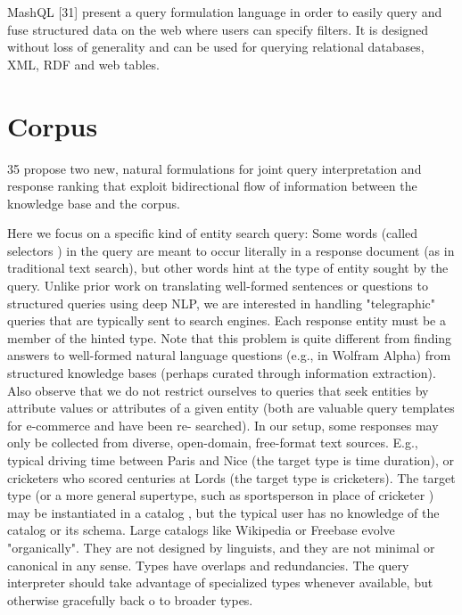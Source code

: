 MashQL [31] present a query formulation language in order to easily query and fuse structured 
data on the web where users can specify filters. It is designed without loss of generality and 
can be used for querying relational databases, XML, RDF and web tables. 

\section{Corpus}
35 propose two new, natural formulations for joint query interpretation and response ranking that exploit bidirectional flow of information between the knowledge base and the corpus.

Here  we  focus  on  a  specific  kind  of  entity  search  query:
Some words (called
selectors
) in the query are meant to occur literally in a response document (as in traditional text
search),  but other words
hint at the type of entity sought
by the query.  Unlike prior work on translating well-formed
sentences or questions to structured queries using deep NLP,
we are interested in handling "telegraphic" queries that are typically sent to search engines.  Each response entity must
be a member of the hinted type.
Note that this problem is quite different from finding answers  to  well-formed  natural  language questions (e.g., in
Wolfram Alpha) from structured knowledge bases (perhaps
curated through information extraction). Also observe that
we do not restrict ourselves to queries that seek entities by
attribute  values  or  attributes  of  a  given  entity  (both  are
valuable query templates for e-commerce and have been re-
searched).   In  our  setup,  some  responses  may  only  be  collected from diverse, open-domain, free-format text sources.
E.g., typical driving
time
between Paris and Nice (the target
type is time duration), or
cricketers
who scored centuries at
Lords (the target type is cricketers).
The  target  type  (or  a  more  general  supertype,  such  as
sportsperson
in place of
cricketer
) may be instantiated in a
catalog
, but the typical user has no knowledge of the catalog
or  its  schema.   Large  catalogs  like  Wikipedia or Freebase
evolve "organically".  They are not designed by linguists, and
they are not minimal or canonical in any sense.  Types have
overlaps  and  redundancies.   The  query  interpreter  should
take advantage of specialized types whenever available, but
otherwise gracefully back o to broader types.


